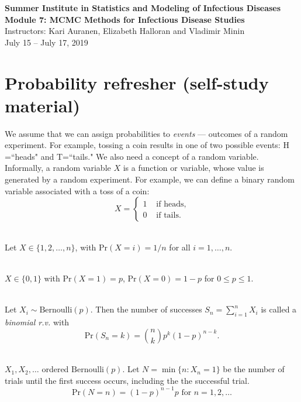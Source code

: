 \documentclass[11pt]{article}\usepackage[]{graphicx}\usepackage[]{color}
\numberwithin{algorithm}{section}
\newcommand{\prob}[1]{\ensuremath{\text{Pr}\left(#1 \right)}}
\theoremstyle{remark}
\theoremstyle{definition}
\newenvironment{example}[1]{\begin{trivlist}
\item[\hskip \labelsep {\bfseries Example}: \underline{#1}]\ \\}{\end{trivlist}}
\begin{document}


\begin{center}
  \textbf{\Large Summer Institute in Statistics and Modeling of Infectious Diseases}\\
  \textbf{\Large Module 7: MCMC Methods for Infectious Disease Studies}\\
  {\large Instructors: Kari Auranen, Elizabeth Halloran and Vladimir Minin}\\
  {\large July 15 -- July 17, 2019}
\end{center}



\section{Probability refresher (self-study material)}


We assume that we can assign probabilities to \textit{events} --- outcomes of a random experiment. For example,
tossing a coin results in one of two possible events: H =``heads" and T=``tails." We also need a concept of a random variable. Informally, a random variable $X$ is a function or variable, whose value is generated by a random experiment. For example, we can define a binary random variable associated with a toss of a coin:
\begin{equation*}
X = 
\begin{cases}
1 &\text{ if heads},\\
0 &\text{ if tails}.
\end{cases}
\end{equation*}

\begin{example}{Discrete uniform random variable}
  Let $X \in \{1,2,\dots,n\}$, with $\prob{X=i} = 1/n$ for all $i = 1,\dots,n$.
\end{example}

\begin{example}{Bernoulli r.v.}
  $X \in \{0,1\}$ with $\prob{X=1}=p$, $\prob{X=0}=1-p$ for $0 \le p \le 1$.
\end{example}

\begin{example}{Binomial r.v.}
  Let $X_i \sim \text{Bernoulli}(p)$. Then the number of successes 
  $S_n = \sum_{i=1}^n X_i$ is called a \textit{binomial r.v.} with 
  \[
  \prob{S_n=k} = {n \choose k} p^k (1-p)^{n-k}.
  \]
\end{example}

\begin{example}{Geometric r.v.}
  $X_1, X_2, \dots$ ordered $\text{Bernoulli}(p)$. Let 
  $N = \min\{n: X_n=1\}$ be the number of trials until the first success occurs, including the 
    the successful trial.
    \[
    \prob{N=n} = (1-p)^{n-1}p  \text{ for } n=1,2,\dots
    \]
\end{example}
\end{document}
